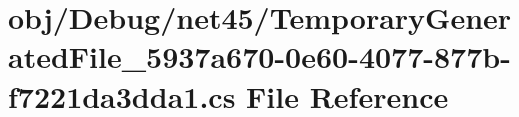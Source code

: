 \hypertarget{net45_2_temporary_generated_file__5937a670-0e60-4077-877b-f7221da3dda1_8cs}{}\section{obj/\+Debug/net45/\+Temporary\+Generated\+File\+\_\+5937a670-\/0e60-\/4077-\/877b-\/f7221da3dda1.cs File Reference}
\label{net45_2_temporary_generated_file__5937a670-0e60-4077-877b-f7221da3dda1_8cs}
